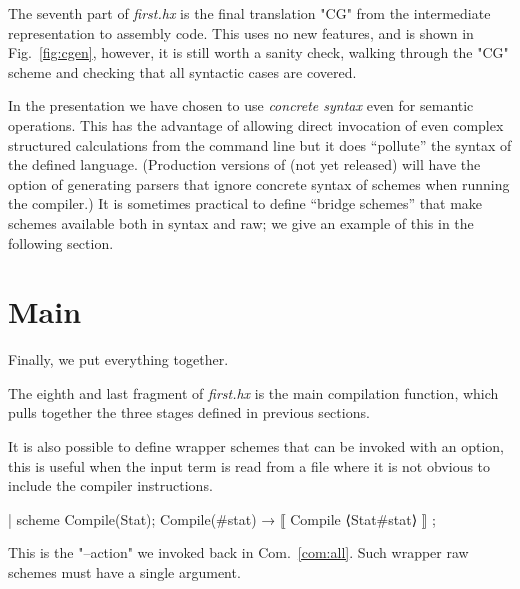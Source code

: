 \documentclass[11pt]{article} %
\begin{document}
\begin{example}\label{ex:cgen}
  The seventh part of \emph{first.hx} is the final translation "CG" from the intermediate
  representation to assembly code. This uses no new features, and is shown in Fig.~\ref{fig:cgen},
  however, it is still worth a sanity check, walking through the "CG" scheme and checking that all
  syntactic cases are covered.
\end{example}

\begin{remark}
  In the presentation we have chosen to use \emph{concrete syntax} even for semantic
  operations. This has the advantage of allowing direct invocation of even complex structured
  calculations from the command line but it does ``pollute'' the syntax of the defined language.
  (Production versions of \HAX (not yet released) will have the option of generating parsers that
  ignore concrete syntax of schemes when running the compiler.) It is sometimes practical to define
  ``bridge schemes'' that make schemes available both in syntax and raw; we give an example of this
  in the following section.
\end{remark}


\section{Main}
\label{sec:main}

Finally, we put everything together.

\begin{example}
  The eighth and last fragment of \emph{first.hx} is the main compilation function, which pulls
  together the three stages defined in previous sections.
  It is also possible to define wrapper schemes that can be invoked with an option, this is useful
  when the input term is read from a file where it is not obvious to include the compiler
  instructions.
\begin{code}[xleftmargin=1.66em,numbers=left,firstnumber=last]
| scheme Compile(Stat);
Compile(#stat) → ⟦ Compile ⟨Stat#stat⟩ ⟧ ;
\end{code}
  This is the "--action" we invoked back in Com.~\ref{com:all}.  Such wrapper raw schemes must have
  a single argument.
\end{example}
\end{document}
